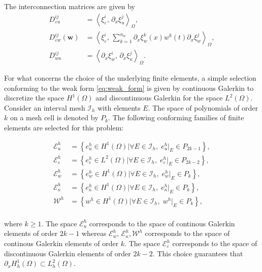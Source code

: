 \documentclass{ifacconf}
\newcommand{\inner}[3][]{\ensuremath{\left\langle #2, \, #3 \right\rangle_{#1}}}
\begin{document}
The interconnection matrices are given by 
\begin{equation}
	\begin{aligned}
	D_{\varepsilon u}^{ij} &= \inner[\Omega]{\xi_\varepsilon^i}{\partial_x \xi_u^j}, \\
	D_{\varepsilon w}^{ij}(\mathbf{w}) &= \inner[\Omega]{\xi_\varepsilon^i}{ \sum_{k=1}^{n_w} \partial_x \xi_w^k(x) w^k(t) \partial_x \xi_w^j}, \\
	D_{w \kappa}^{ij} &= \inner[\Omega]{\partial_x \xi_w^i}{\partial_x \xi_\kappa^j}.
	\end{aligned}
\end{equation}


For what concerns the choice of the underlying finite elements, a simple selection conforming to the weak form \eqref{eq:weak_form} is given by continuous Galerkin to discretize the space $H^1(\Omega)$ and discontinuous Galerkin for the space $L^2(\Omega)$. Consider an interval mesh $\mathcal{I}_h$ with elements $E$. The space of polynomials of order $k$ on a mesh cell is denoted by $P_k$. The following conforming families of finite elements are selected for this problem:

\begin{equation}
	\begin{aligned}
		\mathcal{E}^h_u &= \left\{e_u^h \in H^1(\Omega)\vert \forall E \in \mathcal{I}_h, \; e_u^h\vert_E \in P_{2k-1} \right\}, \\
		\mathcal{E}^h_\varepsilon &= \left\{e_\varepsilon^h \in L^2(\Omega)\vert \forall E \in \mathcal{I}_h, \; e_\varepsilon^h\vert_E \in P_{2k-2} \right\}, \\
		\mathcal{E}^h_w &= \left\{e_w^h \in H^1(\Omega)\vert \forall E \in \mathcal{I}_h, \; e_w^h\vert_E \in P_{k} \right\}, \\
		\mathcal{E}^h_\kappa &= \left\{e_\kappa^h \in H^1(\Omega)\vert \forall E \in \mathcal{I}_h, \; e_\kappa^h\vert_E \in P_{k} \right\}, \\
		\mathcal{W}^h &= \left\{w^h \in H^1(\Omega)\vert \forall E \in \mathcal{I}_h, \; w^h\vert_E \in P_{k} \right\}, \\
	\end{aligned}
\end{equation}

where $k \ge 1$. The space $\mathcal{E}^h_u$ corresponds to the space of continous Galerkin elements of order $2k-1$ whereas $\mathcal{E}^h_w, \, \mathcal{E}^h_\kappa, \mathcal{W}^h$ corresponds to the space of continous Galerkin elements of order $k$. The space $\mathcal{E}^h_\varepsilon$ corresponds to the space of discontinuous Galerkin elements of order $2k-2$. This choice guarantees that $\partial_x H^1_h(\Omega) \subset L^2_h(\Omega)$. 
\end{document}
